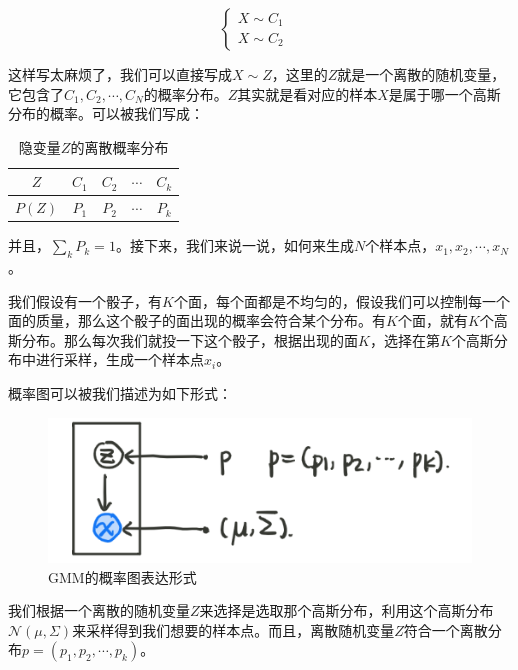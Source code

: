 \documentclass[a4paper]{article}
\begin{document}
\begin{equation}
    \left\{
        \begin{array}{ll}
            X \sim C_1 & \\
            X \sim C_2  
        \end{array}
    \right.
\end{equation}

这样写太麻烦了，我们可以直接写成$X \sim Z$，这里的$Z$就是一个离散的随机变量，它包含了$C_1,C_2,\cdots,C_N$的概率分布。$Z$其实就是看对应的样本$X$是属于哪一个高斯分布的概率。可以被我们写成：
\begin{table}[H]
    \centering
    \begin{tabular}{c|cccc}
         $Z$ & $C_1$ & $C_2$ & $\cdots$ & $C_k$  \\
         \hline
         $P(Z)$ & $P_1$ & $P_2$ & $\cdots$ & $P_k$  \\
    \end{tabular}
    \caption{隐变量$Z$的离散概率分布}
\end{table}

并且，$\sum_k P_k = 1$。接下来，我们来说一说，如何来生成$N$个样本点，$x_1,x_2,\cdots,x_N$。

我们假设有一个骰子，有$K$个面，每个面都是不均匀的，假设我们可以控制每一个面的质量，那么这个骰子的面出现的概率会符合某个分布。有$K$个面，就有$K$个高斯分布。那么每次我们就投一下这个骰子，根据出现的面$K$，选择在第$K$个高斯分布中进行采样，生成一个样本点$x_i$。

概率图可以被我们描述为如下形式：
\begin{figure}[H]
    \centering
    \includegraphics[width=.45\textwidth]{微信图片_20191223234640.png}
    \caption{GMM的概率图表达形式}
    \label{fig:my_label_1}
\end{figure}

我们根据一个离散的随机变量$Z$来选择是选取那个高斯分布，利用这个高斯分布$\mathcal{N}(\mu,\Sigma)$来采样得到我们想要的样本点。而且，离散随机变量$Z$符合一个离散分布$p = (p_1,p_2,\cdots,p_k)$。
\end{document}
